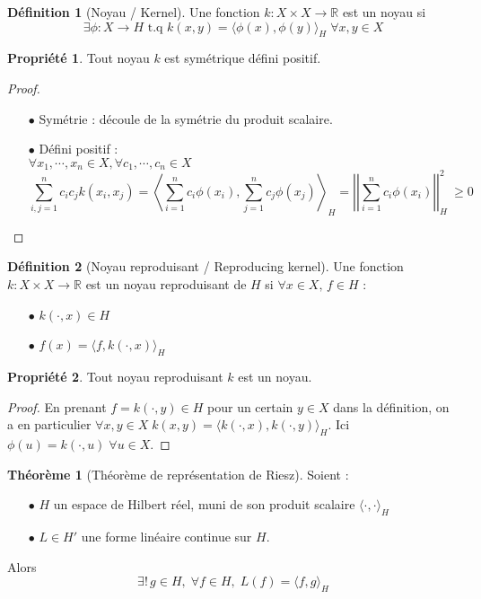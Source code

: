 \documentclass[a4paper, 11pt, french]{article}
\theoremstyle{definition}
\newtheorem{definition}{Définition}
\newtheorem{theorem}{Théorème}
\newtheorem{property}{Propriété}
\begin{document}
	\begin{definition}[Noyau / Kernel]
		Une fonction $k : X \times X \to \mathbb{R}$ est un noyau si
		\[ \exists \phi : X \to H \text{ t.q } k(x,y) = \langle \phi (x), \phi(y) \rangle_H \; \forall x,y \in X \]
	\end{definition}

	\begin{property}
		Tout noyau $k$ est symétrique défini positif.
	\end{property}
	\begin{proof}
		\begin{itemize}
			\item[$\bullet$] Symétrie : découle de la symétrie du produit scalaire.			
			\item[$\bullet$] Défini positif : \\
			$\forall x_1, \cdots, x_n \in X, \forall c_1, \cdots, c_n \in X$
			\[\sum_{i,j=1}^{n} c_i c_j k(x_i, x_j) = \left\langle \sum_{i=1}^{n} c_i \phi(x_i), \sum_{j=1}^{n} c_j \phi(x_j) \right\rangle_H = \left|\left|\sum_{i=1}^{n} c_i \phi(x_i)\right|\right|_H^2\ \geq 0\]
		\end{itemize}
	\end{proof}

	\begin{definition}[Noyau reproduisant / Reproducing kernel]
		Une fonction $k : X \times X \to \mathbb{R}$ est un noyau reproduisant de $H$ si $\forall x \in X, \, f \in H$ :
		\begin{itemize}
			\item[$\bullet$] $k(\cdot, x) \in H$			
			\item[$\bullet$] $f(x) = \langle f, k(\cdot, x) \rangle_H$
		\end{itemize}
	\end{definition}

	\newpage

	\begin{property}
		Tout noyau reproduisant $k$ est un noyau.
	\end{property}
	\begin{proof}
		En prenant $f = k(\cdot, y) \in H$ pour un certain $y \in X$ dans la définition, on a en particulier $\forall x, y \in X \; k(x,y) = \langle k(\cdot, x), k(\cdot, y) \rangle_H$. Ici $\phi(u) = k(\cdot, u) \; \forall u \in X$.
	\end{proof}

	\begin{theorem}[Théorème de représentation de Riesz]
		Soient :
		\begin{itemize}
			\item[$\bullet$] $H$ un espace de Hilbert réel, muni de son produit scalaire $\langle \cdot, \cdot \rangle_H$
			\item[$\bullet$] $L \in H'$ une forme linéaire continue sur $H$.
		\end{itemize}
		Alors \[\exists ! \, g \in H, \; \forall f \in H, \; L(f) = \langle f, g \rangle_H\]
	\end{theorem}
\end{document}
